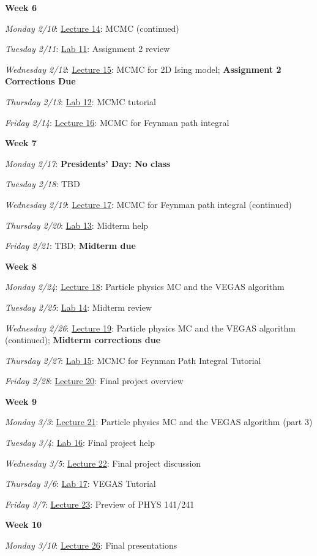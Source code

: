 \documentclass[12pt]{article}
\begin{document}
\noindent\textbf{Week 6}

\emph{Monday 2/10}: \underline{Lecture 14}: MCMC (continued)

\emph{Tuesday 2/11}: \underline{Lab 11}: Assignment 2 review

\emph{Wednesday 2/12}: \underline{Lecture 15}: MCMC for 2D Ising model; \textbf{Assignment 2 Corrections Due}

\emph{Thursday 2/13}: \underline{Lab 12}: MCMC tutorial

\emph{Friday 2/14}: \underline{Lecture 16}: MCMC for Feynman path integral

\noindent\textbf{Week 7}

\emph{Monday 2/17}: \textbf{Presidents' Day: No class}

\emph{Tuesday 2/18}: TBD

\emph{Wednesday 2/19}: \underline{Lecture 17}: MCMC for Feynman path integral (continued)

\emph{Thursday 2/20}: \underline{Lab 13}: Midterm help

\emph{Friday 2/21}: TBD; \textbf{Midterm due}

\noindent\textbf{Week 8}

\emph{Monday 2/24}: \underline{Lecture 18}: Particle physics MC and the VEGAS algorithm

\emph{Tuesday 2/25}: \underline{Lab 14}: Midterm review

\emph{Wednesday 2/26}: \underline{Lecture 19}: Particle physics MC and the VEGAS algorithm (continued); \textbf{Midterm corrections due}

\emph{Thursday 2/27}: \underline{Lab 15}: MCMC for Feynman Path Integral Tutorial

\emph{Friday 2/28}: \underline{Lecture 20}: Final project overview

\noindent\textbf{Week 9}

\emph{Monday 3/3}: \underline{Lecture 21}: Particle physics MC and the VEGAS algorithm (part 3)

\emph{Tuesday 3/4}: \underline{Lab 16}: Final project help

\emph{Wednesday 3/5}: \underline{Lecture 22}: Final project discussion

\emph{Thursday 3/6}: \underline{Lab 17}: VEGAS Tutorial

\emph{Friday 3/7}: \underline{Lecture 23}: Preview of PHYS 141/241

\noindent\textbf{Week 10}

\emph{Monday 3/10}: \underline{Lecture 26}: Final presentations
\end{document}
